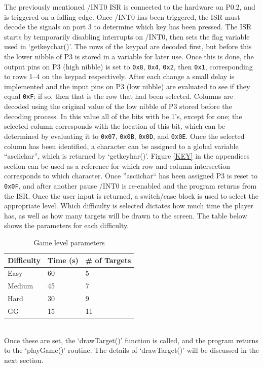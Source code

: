 \documentclass[12pt]{article}
\begin{document}
	The previously mentioned /INT0 ISR is connected to the hardware on P0.2, and is triggered on a falling edge. Once /INT0 has been triggered, the ISR must decode the signals on port 3 to determine which key has been pressed. The ISR starts by temporarily disabling interrupts on /INT0, then sets the flag variable used in `getkeychar()'. The rows of the keypad are decoded first, but before this the lower nibble of P3 is stored in a variable for later use. Once this is done, the output pins on P3 (high nibble) is set to \texttt{0x8}, \texttt{0x4}, \texttt{0x2}, then \texttt{0x1}, corresponding to rows 1--4 on the keypad respectively. After each change a small delay is implemented and the input pins on P3 (low nibble) are evaluated to see if they equal \texttt{0xF}; if so, then that is the row that had been selected. Columns are decoded using the original value of the low nibble of P3 stored before the decoding process. In this value all of the bits with be 1's, except for one; the selected column corresponds with the location of this bit, which can be determined by evaluating it to \texttt{0x07}, \texttt{0x0B}, \texttt{0x0D}, and \texttt{0x0E}. Once the selected column has been identified, a character can be assigned to a global variable ``asciichar'', which is returned by `getkeyhar()'. Figure \ref{KEY} in the appendices section can be used as a reference for which row and column intersection corresponds to which character. Once ''asciichar`` has been assigned P3 is reset to \texttt{0x0F}, and after another pause /INT0 is re-enabled and the program returns from the ISR. Once the user input is returned, a switch/case block is used to select the appropriate level. Which difficulty is selected dictates how much time the player has, as well as how many targets will be drawn to the screen. The table below shows the parameters for each difficulty. \\
	\begin{table}[h]
		\centering
		\begin{tabular}{|l|l|l|}
			\hline
			Difficulty & Time (s) & \# of Targets \\ \hline
			Easy       & 60       & 5             \\ \hline
			Medium     & 45   	  & 7             \\ \hline
			Hard       & 30   	  & 9             \\ \hline
			GG         & 15   	  & 11            \\ \hline
		\end{tabular}
		\caption{Game level parameters}
		\label{difficulty}
	\end{table}\\
	Once these are set, the `drawTarget()' function is called, and the program returns to the `playGame()' routine. The details of `drawTarget()' will be discussed in the next section. 
	
\end{document}
